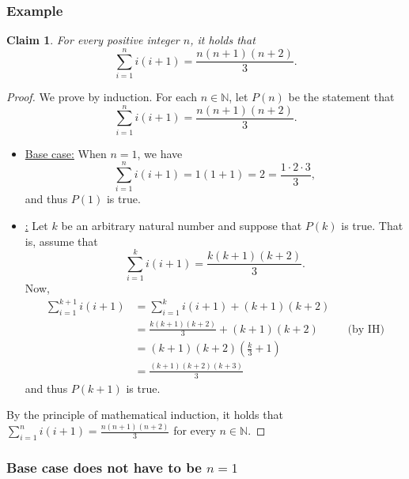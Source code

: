 \documentclass[11pt]{article}
\theoremstyle{plain}
\newtheorem*{claim}{Claim}
\theoremstyle{plain}
\theoremstyle{remark}
\def\naturals{\mathbb{N}}
\begin{document}
\subsubsection*{Example}
\begin{tcolorbox}
\begin{claim}
 For every positive integer $n$, it holds that 
 \[
  \sum_{i=1}^n i(i+1) = \frac{n(n+1)(n+2)}{3}.
 \]

\end{claim}
\end{tcolorbox}
 
 
 
\begin{proof}
 We prove by induction. For each $n\in\naturals$,  let  $P(n)$ be the statement that \[\displaystyle\sum_{i=1}^ni(i+1)=\frac{n(n+1)(n+2)}{3}.\] 
 \begin{itemize}
  \item\underline{Base case:} When $n=1$, we have
  \[
   \sum_{i=1}^ni(i+1) = 1(1+1) = 2 = \frac{1\cdot 2\cdot 3}{3},
  \]
and thus $P(1)$ is true.
\item\underline{:} Let $k$ be an arbitrary natural number and suppose that $P(k)$ is true. That is, assume that 
\[
\sum_{i=1}^ki(i+1)=\frac{k(k+1)(k+2)}{3}. \tag{IH}
\]
Now, 
\begin{align*}
 \sum_{i=1}^{k+1}i(i+1) 
            &= \sum_{i=1}^ki(i+1) + (k+1)(k+2) \\
           &= \frac{k(k+1)(k+2)}{3} + (k+1)(k+2)&& \text{(by IH)}\\
           &= (k+1)(k+2)\left(\frac{k}{3} + 1\right)\\
           &=\frac{(k+1)(k+2)(k+3)}{3}
\end{align*}
and thus $P(k+1)$ is true.
 \end{itemize}
By the principle of mathematical induction, it holds that $\displaystyle\sum_{i=1}^ni(i+1)=\frac{n(n+1)(n+2)}{3}$ for every $n\in\naturals$.
\end{proof}

\subsubsection*{Base case does not have to be $n=1$}
\end{document}
